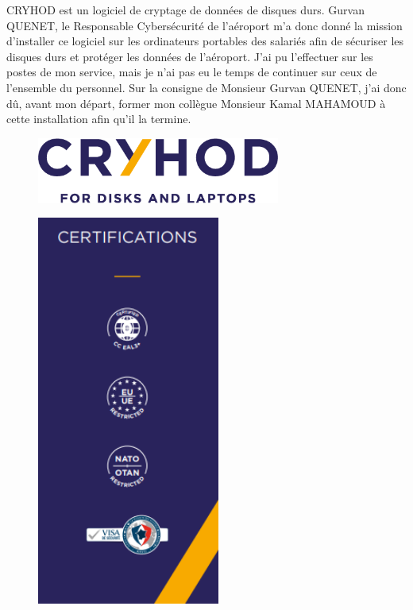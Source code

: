 CRYHOD est un logiciel de cryptage de données de disques durs. Gurvan QUENET, le Responsable Cybersécurité de l’aéroport m’a donc donné la mission d’installer ce logiciel sur les ordinateurs portables des salariés afin de sécuriser les disques durs et protéger les données de l’aéroport. J’ai pu l’effectuer sur les postes de mon service, mais je n'ai pas eu le temps de continuer sur ceux de l'ensemble du personnel. Sur la consigne de Monsieur Gurvan QUENET, j'ai donc dû, avant mon départ, former mon collègue Monsieur Kamal MAHAMOUD à cette installation afin qu'il la termine.\newline

\begin{figure}[hbt!]
  \centering
  \includegraphics[width=8cm]{Images/logo_cryhod.png}
  \label{fig:logocryhod}
\end{figure}

\begin{figure}[hbt!]
  \centering
  \includegraphics[width=6cm]{Images/cryhod.png}
  \label{fig:cryhod}
\end{figure}

\newpage

